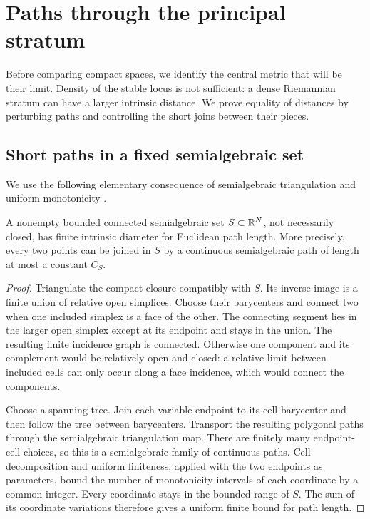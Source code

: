 \section{Paths through the principal stratum}\label{sec:paths}

Before comparing compact spaces, we identify the central metric that
will be their limit. Density of the stable locus is not sufficient:
a dense Riemannian stratum can have a larger intrinsic distance.
We prove equality of distances by perturbing paths and controlling
the short joins between their pieces.

\subsection{Short paths in a fixed semialgebraic set}
We use the following elementary consequence of semialgebraic
triangulation and uniform monotonicity
\cite[pp.~116,130,133]{vandendries}.

\begin{lemma}\label{lem:bounded-paths}
A nonempty bounded connected semialgebraic set \(S\subset\mathbb R^N\),
not necessarily closed, has finite intrinsic diameter for
Euclidean path length. More precisely, every two points can be
joined in \(S\) by a continuous semialgebraic path of length at
most a constant \(C_S\).
\end{lemma}

\begin{proof}
Triangulate the compact closure compatibly with \(S\).
Its inverse image is a finite union of relative open simplices.
Choose their barycenters and connect two when one included simplex
is a face of the other. The connecting segment lies in the larger
open simplex except at its endpoint and stays in the union.
The resulting finite incidence graph is connected. Otherwise one
component and its complement would be relatively open and closed:
a relative limit between included cells can only occur along a
face incidence, which would connect the components.

Choose a spanning tree. Join each variable endpoint to its cell
barycenter and then follow the tree between barycenters. Transport
the resulting polygonal paths through the semialgebraic
triangulation map. There are finitely many endpoint-cell choices,
so this is a semialgebraic family of continuous paths. Cell decomposition and uniform finiteness, applied with the two
endpoints as parameters, bound the number of monotonicity intervals
of each coordinate by a common integer. Every coordinate stays in the
bounded range of \(S\). The sum of its coordinate variations
therefore gives a uniform finite bound for path length.
\end{proof}

